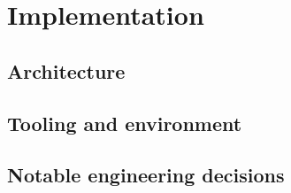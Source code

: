 \chapter{Implementation}
\label{ch:implementation}

\section{Architecture}
\label{sec:impl-architecture}

\section{Tooling and environment}
\label{sec:impl-tooling}

\section{Notable engineering decisions}
\label{sec:impl-decisions}


